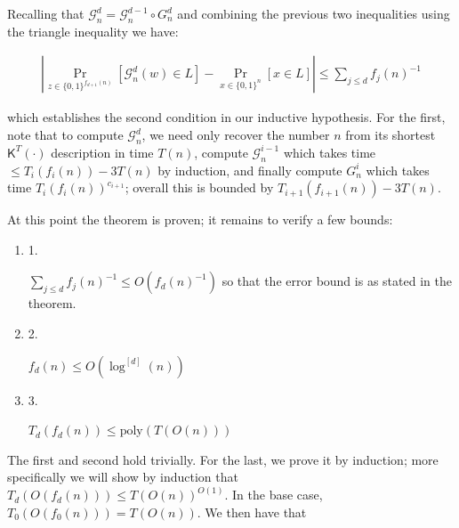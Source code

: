 Recalling that $\mathcal{G}^{d}_{n}=\mathcal{G}^{d-1}_{n}\circ G^{d}_{n}$ and combining the previous two inequalities using the triangle inequality we have:\par


\[\begin{gathered}
|\Pr_{z\in\{0,1\}^{f_{d+1}(n)}}[\mathcal{G}^{d}_{n}(w)\in L]-\Pr_{x\in\{0,1\}^{n}}[x\in L]|\leq\sum_{j\leq d}f_{j}(n)^{-1}
\end{gathered}\]


which establishes the second condition in our inductive hypothesis. For the first, note that to compute $\mathcal{G}^{d}_{n}$, we need only recover the number $n$ from its shortest ${\mathsf{K}}^{T}(\cdot)$ description in time $T(n)$, compute $\mathcal{G}^{i-1}_{n}$ which takes time $\leq T_{i}(f_{i}(n))-3T(n)$ by induction, and finally compute $G^{i}_{n}$ which takes time $T_{i}(f_{i}(n))^{c_{i+1}}$; overall this is bounded by $T_{i+1}(f_{i+1}(n))-3T(n)$.\par




At this point the theorem is proven; it remains to verify a few bounds:\par


\begin{enumerate}


\item[] 
1. 


$\sum_{j\leq d}f_{j}(n)^{-1}\leq O(f_{d}(n)^{-1})$ so that the error bound is as stated in the theorem.\par





\item[] 
2. 


$f_{d}(n)\leq O(\log^{[d]}(n))$\par





\item[] 
3. 


$T_{d}(f_{d}(n))\leq\mathrm{poly}(T(O(n)))$\par





\end{enumerate}


The first and second hold trivially. For the last, we prove it by induction; more specifically we will show by induction that $T_{d}(O(f_{d}(n)))\leq T(O(n))^{O(1)}$. In the base case, $T_{0}(O(f_{0}(n)))=T(O(n))$. We then have that\par


